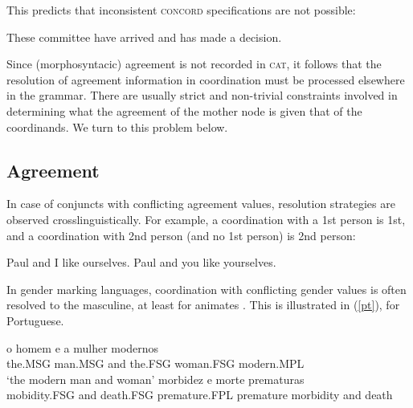 \documentclass[output=paper]{langsci/langscibook}
\begin{document}
\noindent
This predicts that inconsistent  \textsc{concord} specifications are not possible:

\begin{exe}
\ex{*} These committee  have arrived and has made a decision.
\end{exe}

\noindent
Since (morphosyntacic) agreement is not recorded in \textsc{cat}, it follows that the resolution of agreement information in coordination must be processed elsewhere in the grammar. There are usually strict and non-trivial constraints involved in determining what the agreement of the mother node is given that of the coordinands. We turn to this problem below.







\subsection{Agreement}


In case of conjuncts with conflicting agreement values, resolution strategies are observed crosslinguistically. For example, a coordination with a 1st person is 1st, and a coordination with 2nd person (and no 1st person) is 2nd person:

\begin{exe}
 \ex
\begin{xlista}
\ex Paul and I like ourselves.
\ex Paul and you like yourselves.
\end{xlista}
\end{exe}

In gender marking languages, coordination with conflicting gender values is often resolved to the masculine, at least for animates \citep{Corbet91}. This is illustrated in (\ref{pt}), for Portuguese.

\begin{exe}
 \ex
\begin{xlista}
\ex o homem e a mulher modernos \\
the.MSG man.MSG and the.FSG woman.FSG modern.MPL \\
`the modern man and woman'
\ex morbidez e morte prematuras \\
mobidity.FSG and death.FSG premature.FPL
premature morbidity and death\\
\citep[433]{Villavicencio:Sadler:ea:05}
\end{xlista}\label{pt}
\end{exe}
\end{document}
